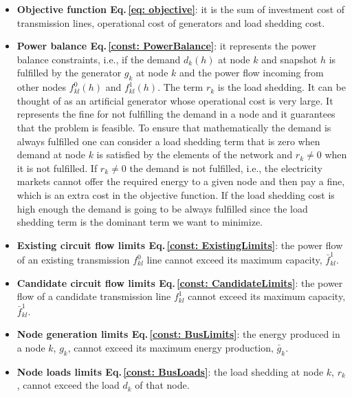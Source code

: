\begin{itemize}
    \item \textbf{Objective function Eq.\,\eqref{eq: objective}}: it is the sum of investment cost of transmission lines, operational cost of generators and load shedding cost.
    \item \textbf{Power balance Eq.\,\eqref{const: PowerBalance}}: it represents the power balance constraints, i.e., if the demand $d_{k}(h)$ at node $k$ and snapshot $h$ is fulfilled by the generator $g_{k}$ at node $k$ and the power flow incoming from other nodes $f_{kl}^{0}(h)$ and $f_{kl}^{1}(h)$. The term $r_{k}$ is the load shedding. It can be thought of as an artificial generator whose operational cost is very large. It represents the fine for not fulfilling the demand in a node and it guarantees that the problem is feasible. To ensure that mathematically the demand is always fulfilled one can consider a load shedding term that is zero when demand at node $k$ is satisfied by the elements of the network and $r_{k} \neq 0$ when it is not fulfilled. If $r_{k} \neq 0$ the demand is not fulfilled, i.e., the electricity markets cannot offer the required energy to a given node and then pay a fine, which is an extra cost in the objective function. If the load shedding cost is high enough the demand is going to be always fulfilled since the load shedding term is the dominant term we want to minimize.
    \item \textbf{Existing circuit flow limits Eq.\,\eqref{const: ExistingLimits}}: the power flow of an existing transmission $f_{kl}^{0}$ line cannot exceed its maximum capacity, $\bar{f}_{kl}^{1}$.
    \item \textbf{Candidate circuit flow limits Eq.\,\eqref{const: CandidateLimits}}: the power flow of a candidate transmission line $f_{kl}^{1}$ cannot exceed its maximum capacity, $\bar{f}_{kl}^{1}$.
    \item \textbf{Node generation limits Eq.\,\eqref{const: BusLimits}}: the energy produced in a node $k$, $g_{k}$, cannot exceed its maximum energy production, $\bar{g}_{k}$.
    \item \textbf{Node loads limits Eq.\,\eqref{const: BusLoads}}: the load shedding at node $k$, $r_{k}$, cannot exceed the load $d_{k}$ of that node. 
\end{itemize}
